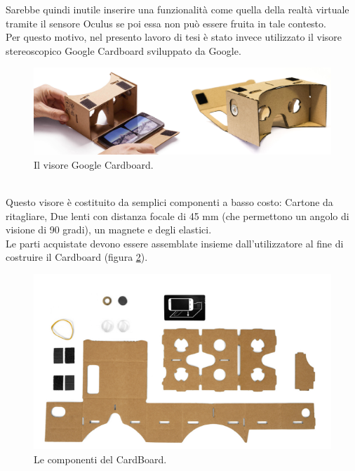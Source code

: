 Sarebbe quindi inutile inserire una funzionalità come quella della realtà virtuale tramite il sensore Oculus se poi  essa non può essere fruita in tale contesto.
\\
Per questo motivo, nel presento lavoro di tesi è stato invece utilizzato il visore stereoscopico Google Cardboard sviluppato da Google.
\\
\begin{figure}[htb]
 \centering
 \includegraphics[width=1\linewidth]{images/chapter_navigazione_scena/cardboard.png}\hfill
 \caption[Il visore Google Cardboard.]{Il visore Google Cardboard.}
 \label{fig:navigazione_scena_navigator_oculus}
\end{figure}
\\
Questo visore è costituito da semplici componenti a basso costo: Cartone da ritagliare, Due lenti con distanza focale di 45 mm (che permettono un angolo di visione di 90 gradi), un magnete e degli elastici.
\\
Le parti acquistate devono essere assemblate insieme dall’utilizzatore al fine di costruire il Cardboard (figura \ref{fig:navigazione_scena_navigator_cardboard_pezzi}).
\begin{figure}[htb]
 \centering
 \includegraphics[width=0.8\linewidth]{images/chapter_navigazione_scena/cardboard_pezzi.png}\hfill
 \caption[Le componenti del CardBoard.]{Le componenti del CardBoard.}
 \label{fig:navigazione_scena_navigator_cardboard_pezzi}
\end{figure}
\\
